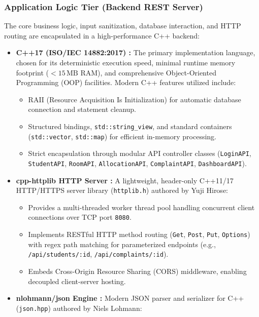 \documentclass[12pt,a4paper]{article}
\begin{document}
\subsubsection{Application Logic Tier (Backend REST Server)}
The core business logic, input sanitization, database interaction, and HTTP routing are encapsulated in a high-performance C++ backend:
\begin{itemize}
    \item \textbf{C++17 (ISO/IEC 14882:2017) \cite{cpp17}:} The primary implementation language, chosen for its deterministic execution speed, minimal runtime memory footprint ($<15\,\text{MB}$ RAM), and comprehensive Object-Oriented Programming (OOP) facilities. Modern C++ features utilized include:
    \begin{itemize}
        \item RAII (Resource Acquisition Is Initialization) for automatic database connection and statement cleanup.
        \item Structured bindings, \texttt{std::string\_view}, and standard containers (\texttt{std::vector}, \texttt{std::map}) for efficient in-memory processing.
        \item Strict encapsulation through modular API controller classes (\texttt{LoginAPI}, \texttt{StudentAPI}, \texttt{RoomAPI}, \texttt{AllocationAPI}, \texttt{ComplaintAPI}, \texttt{DashboardAPI}).
    \end{itemize}
    \item \textbf{cpp-httplib HTTP Server \cite{httplib}:} A lightweight, header-only C++11/17 HTTP/HTTPS server library (\texttt{httplib.h}) authored by Yuji Hirose:
    \begin{itemize}
        \item Provides a multi-threaded worker thread pool handling concurrent client connections over TCP port \texttt{8080}.
        \item Implements RESTful HTTP method routing (\texttt{Get}, \texttt{Post}, \texttt{Put}, \texttt{Options}) with regex path matching for parameterized endpoints (e.g., \texttt{/api/students/:id}, \texttt{/api/complaints/:id}).
        \item Embeds Cross-Origin Resource Sharing (CORS) middleware, enabling decoupled client-server hosting.
    \end{itemize}
    \item \textbf{nlohmann/json Engine \cite{nlohmann}:} Modern JSON parser and serializer for C++ (\texttt{json.hpp}) authored by Niels Lohmann:
    \begin{itemize}

\end{itemize}
\end{itemize}
\end{document}
